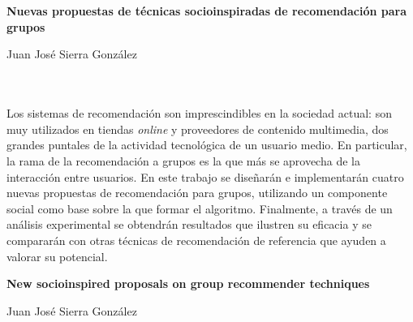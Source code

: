 \chapter*{}






\cleardoublepage
\thispagestyle{empty}

\begin{center}
{\large\bfseries Nuevas propuestas de técnicas socioinspiradas de recomendación para grupos}\\
\end{center}
\begin{center}
Juan José Sierra González\\
\end{center}

\\

\vspace{0.7cm}
\\

Los sistemas de recomendación son imprescindibles en la sociedad actual: son muy utilizados en tiendas \textit{online} y proveedores de contenido multimedia, dos grandes puntales de la actividad tecnológica de un usuario medio. En particular, la rama de la recomendación a grupos es la que más se aprovecha de la interacción entre usuarios. En este trabajo se diseñarán e implementarán cuatro nuevas propuestas de recomendación para grupos, utilizando un componente social como base sobre la que formar el algoritmo. Finalmente, a través de un análisis experimental se obtendrán resultados que ilustren su eficacia y se compararán con otras técnicas de recomendación de referencia que ayuden a valorar su potencial.
\cleardoublepage


\thispagestyle{empty}


\begin{center}
{\large\bfseries New socioinspired proposals on group recommender techniques}\\
\end{center}
\begin{center}
Juan José Sierra González\\
\end{center}

